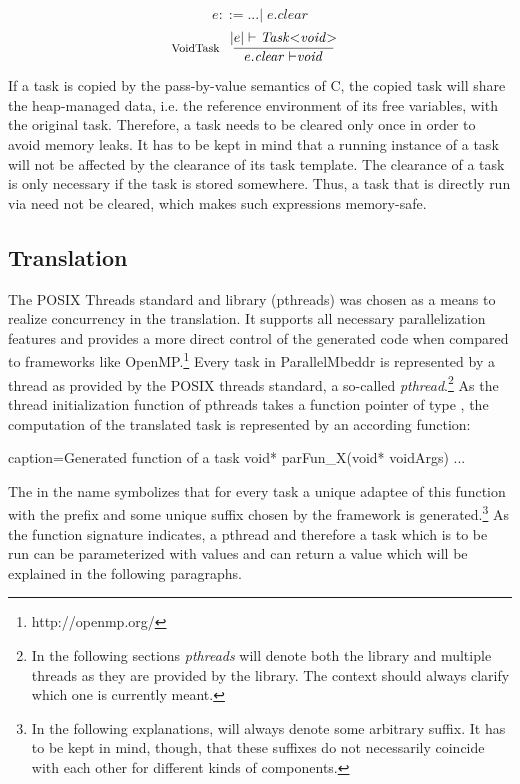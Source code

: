 \begin{equation}
e ::= ...|\;e.\mathit{clear}
\end{equation}
\begin{equation}
\inference*[VoidTask]{|e| |- \mathit{Task{<}void{>}}}{e.\mathit{clear |-} \mathit{void}} 
\end{equation}

If a task is copied by the pass-by-value semantics of C, the copied task will share the heap-managed data, i.e. the reference environment of its free variables, with the original task. Therefore, a task needs to be cleared only once in order to avoid memory leaks. It has to be kept in mind that a running instance of a task will not be affected by the clearance of its task template. The clearance of a task is only necessary if the task is stored somewhere. Thus, a task that is directly run via  need not be cleared, which makes such expressions memory-safe.

\subsection{Translation}
\label{tasksTranslation}
The POSIX Threads standard and library (pthreads) was chosen as a means to realize concurrency in the translation. It supports all necessary parallelization features and provides a more direct control of the generated code when compared to frameworks like OpenMP.\footnote{http://openmp.org/} Every task in ParallelMbeddr is represented by a thread as provided by the POSIX threads standard, a so-called \textit{pthread}.\footnote{In the following sections \textit{pthreads} will denote both the library and multiple threads as they are provided by the library. The context should always clarify which one is currently meant.} As the thread initialization function of pthreads takes a function pointer of type , the computation of the translated task is represented by an according function:

\begin{ccode}{caption=Generated function of a task}
void* parFun_X(void* voidArgs) {...}
\end{ccode}

The  in the name symbolizes that for every task a unique adaptee of this function with the prefix  and some unique suffix chosen by the framework is generated.\footnote{In the following explanations,  will always denote some arbitrary suffix. It has to be kept in mind, though, that these suffixes do not necessarily coincide with each other for different kinds of components.} As the function signature indicates, a pthread and therefore a task which is to be run can be parameterized with values and can return a value which will be explained in the following paragraphs.

